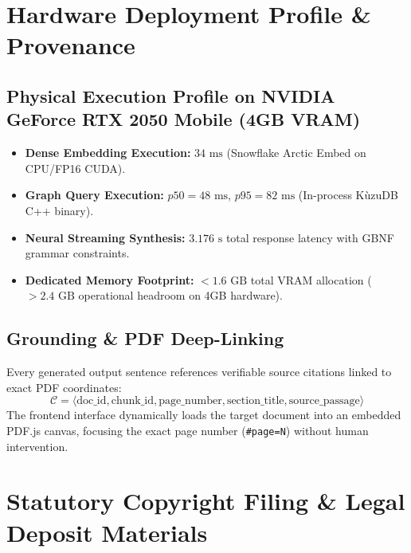 \documentclass[10pt,a4paper]{article}
\begin{document}
\section{Hardware Deployment Profile \& Provenance}
\subsection{Physical Execution Profile on NVIDIA GeForce RTX 2050 Mobile (4GB VRAM)}
\begin{itemize}\setlength{\itemsep}{0pt}\setlength{\parskip}{0pt}
\item \textbf{Dense Embedding Execution:} $34\text{ ms}$ (Snowflake Arctic Embed on CPU/FP16 CUDA).
\item \textbf{Graph Query Execution:} $p50 = 48\text{ ms}$, $p95 = 82\text{ ms}$ (In-process K\`uzuDB C++ binary).
\item \textbf{Neural Streaming Synthesis:} $3.176\text{ s}$ total response latency with GBNF grammar constraints.
\item \textbf{Dedicated Memory Footprint:} $<1.6\text{ GB}$ total VRAM allocation ($>2.4\text{ GB}$ operational headroom on 4GB hardware).
\end{itemize}

\subsection{Grounding \& PDF Deep-Linking}
Every generated output sentence references verifiable source citations linked to exact PDF coordinates:
\begin{equation}
\mathcal{C} = \langle \text{doc\_id}, \text{chunk\_id}, \text{page\_number}, \text{section\_title}, \text{source\_passage} \rangle
\end{equation}
The frontend interface dynamically loads the target document into an embedded PDF.js canvas, focusing the exact page number (\texttt{\#page=N}) without human intervention.

\newpage

\section{Statutory Copyright Filing \& Legal Deposit Materials}
\end{document}
